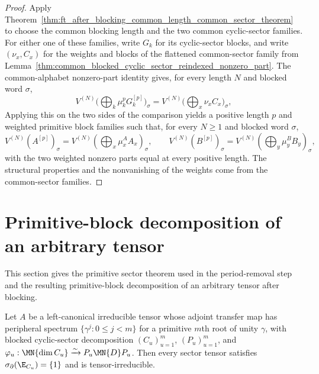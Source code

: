 \begin{proof}
    \leanok
    Apply
    Theorem~\ref{thm:ft_after_blocking_common_length_common_sector_theorem} to
    choose the common blocking length and the two common cyclic-sector families.
    For either one of these families, write $G_k$ for its cyclic-sector blocks,
    and write $(\nu_x,C_x)$ for the weights and blocks of the flattened
    common-sector family from
    Lemma~\ref{thm:common_blocked_cyclic_sector_reindexed_nonzero_part}. The
    common-alphabet nonzero-part identity gives, for every length $N$ and
    blocked word $\sigma$,
    \[
        V^{(N)}\!
        \bigl(\textstyle\bigoplus_k \mu_k^p G_k^{[p]}\bigr)_\sigma
        =
        V^{(N)}\!
        \bigl(\textstyle\bigoplus_x \nu_x C_x\bigr)_\sigma ,
    \]
    Applying this on the two sides of the comparison yields a positive length
    $p$ and weighted primitive block families such that, for every $N\ge 1$ and
    blocked word $\sigma$,
    \[
        V^{(N)}\!(A^{[p]})_\sigma
        =
        V^{(N)}\!(\textstyle\bigoplus_x \mu^A_x A_x)_\sigma,
        \qquad
        V^{(N)}\!(B^{[p]})_\sigma
        =
        V^{(N)}\!(\textstyle\bigoplus_y \mu^B_y B_y)_\sigma,
    \]
    with the two weighted nonzero parts equal at every positive length. The
    structural properties and the nonvanishing of the weights come from the
    common-sector families.
\end{proof}

\section{Primitive-block decomposition of an arbitrary tensor}%
\label{sec:ch11b_primitive_block_reduction}

This section gives the primitive sector theorem used in the period-removal step
and the resulting primitive-block decomposition of an arbitrary tensor after
blocking.

\begin{theorem}%
    \label{thm:blocked_sector_unconditional}
    \leanok
    Let $A$ be a left-canonical irreducible tensor whose adjoint transfer map has
    peripheral spectrum $\{\gamma^j : 0 \le j < m\}$ for a primitive $m$th root of
    unity $\gamma$, with blocked cyclic-sector decomposition $(C_u)_{u=1}^m$,
    $(P_u)_{u=1}^m$, and
    $\varphi_u : \MN{\dim C_u} \xrightarrow{\sim} P_u \MN{D} P_u$. Then every
    sector tensor satisfies $\sigma_\partial(\E_{C_u})=\{1\}$ and is
    tensor-irreducible.
\end{theorem}

